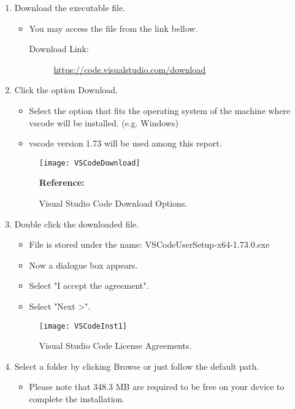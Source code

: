 \begin{enumerate}
	\item Download the executable file.
	\begin{itemize}
		\item You may access the file from the link bellow.
		\begin{description}
			\item[Download Link:] \url{https://code.visualstudio.com/download}
		\end{description}
	\end{itemize}
	\item Click the option Download.
		\begin{itemize}
		\item Select the option that fits the operating system of the machine where \ac{vscode} will be installed. (e.g. Windows) 
		\item \ac{vscode} version 1.73 will be used among this report.
	\end{itemize}
	\begin{figure}  [H]
		\begin{center}
			\texttt{[image: VSCodeDownload]}
			\caption{Visual Studio Code Download Options.} 
			\label{fig:Visual Studio Code Download Options.}
			\footnotesize \textbf{Reference:} \autocite{Microsoft:2022}
		\end{center}
	\end{figure}
	\item Double click the downloaded file.
	\begin{itemize}
		\item File is stored under the name: VSCodeUserSetup-x64-1.73.0.exe
		\item Now a dialogue box appears.
		\item Select "I accept the agreement".
		\item Select "Next >".
	\end{itemize}
	\begin{figure}  [H]
		\begin{center}
			\texttt{[image: VSCodeInst1]}
			\caption{Visual Studio Code License Agreements.} 
			\label{fig:Visual Studio Code License Agreements.}
		\end{center}
	\end{figure}
	\item Select a folder by clicking Browse or just follow the default path.
	\begin{itemize}
		\item Please note that 348.3 MB are required to be free on your device to complete the installation.

\end{itemize}
\end{enumerate}
